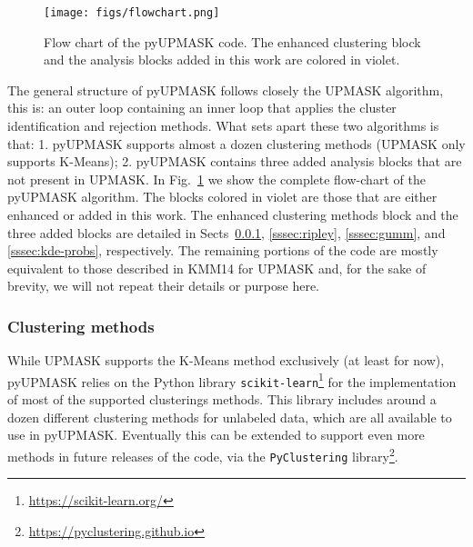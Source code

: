 \documentclass{aa}
\begin{document}
  \begin{figure}
   \centering
   \texttt{[image: figs/flowchart.png]}
   \caption{Flow chart of the pyUPMASK code. The enhanced clustering block and
   the analysis blocks added in this work are colored in violet.}
   \label{fig:flowchart}
  \end{figure}

  The general structure of pyUPMASK follows closely the UPMASK algorithm, this
  is: an outer loop containing an inner loop that applies the cluster
  identification and rejection methods. What sets apart these two algorithms
  is that: 1. pyUPMASK supports almost a dozen clustering
  methods (UPMASK only supports K-Means); 2. pyUPMASK contains
  three added analysis blocks that are not present in UPMASK.
  In Fig.~\ref{fig:flowchart} we show the complete flow-chart of the pyUPMASK
  algorithm. The blocks colored in violet are those that are either enhanced or
  added in this work.
  The enhanced clustering methods block and the three added blocks are detailed
  in Sects~\ref{sssec:clustering}, \ref{sssec:ripley},
  \ref{sssec:gumm}, and \ref{sssec:kde-probs}, respectively. The remaining
  portions of the code are mostly equivalent to those described in KMM14 for
  UPMASK and, for the sake of brevity, we will not repeat their details or
  purpose here.

 

\subsubsection{Clustering methods}
 \label{sssec:clustering}

 While UPMASK supports the K-Means method exclusively (at least for now),
 pyUPMASK relies on the Python library
 \texttt{scikit-learn}\footnote{\url{https://scikit-learn.org/}}
 \citep{scikit-learn} for the implementation of most of the supported
 clusterings methods. This library includes around a dozen different
 clustering methods for unlabeled data, which are all available to use in
 pyUPMASK. Eventually this can be extended to support even more methods
 in future releases of the code, via the \texttt{PyClustering}
 library\footnote{\url{https://pyclustering.github.io}}.\\
\end{document}
